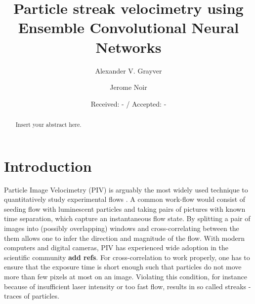 \documentclass{svjour3}                     %
\begin{document}
\title{Particle streak velocimetry using Ensemble Convolutional Neural Networks}

\author{Alexander V. Grayver         \and
        Jerome Noir
}


\date{Received: - / Accepted: -}


\maketitle

\begin{abstract}
Insert your abstract here. 
\end{abstract}

\section{Introduction}
\label{sec:intro}

Particle Image Velocimetry (PIV) is arguably the most widely used technique to quantitatively study experimental flows \cite{raffel2018particle}. A common work-flow would consist of seeding flow with luminescent particles and taking pairs of pictures with known time separation, which capture an instantaneous flow state. By splitting a pair of images into (possibly overlapping) windows and cross-correlating between the them allows one to infer the direction and magnitude of the flow. With modern computers and digital cameras, PIV has experienced wide adoption in the scientific community \textbf{add refs}. For cross-correlation to work properly, one has to ensure that the exposure time is short enough such that particles do not move more than few pixels at most on an image. Violating this condition, for instance because of insufficient laser intensity or too fast flow, results in so called streaks - traces of particles.
\end{document}
